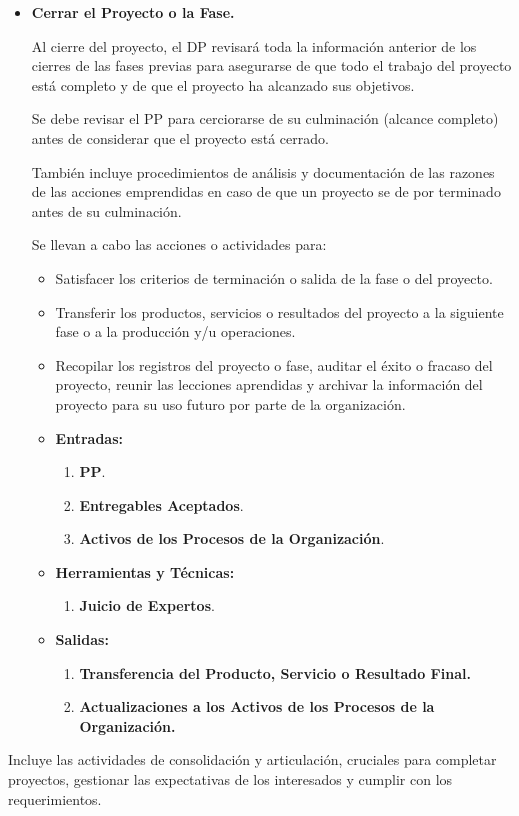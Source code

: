 \documentclass[10pt,a4paper]{article}
\begin{document}
\begin{itemize}
\item \textbf{Cerrar el Proyecto o la Fase.}	

Al cierre del proyecto, el DP revisará toda la información anterior de los cierres de las fases previas para asegurarse de que todo el trabajo del proyecto está completo y de que el proyecto ha alcanzado sus objetivos.

Se debe revisar el PP para cerciorarse de su culminación (alcance completo) antes de considerar que el proyecto está cerrado.

También incluye procedimientos de análisis y documentación de las razones de las acciones emprendidas en caso de que un proyecto se de por terminado antes de su culminación.

Se llevan a cabo las acciones o actividades para:
\begin{itemize}
\item Satisfacer los criterios de terminación o salida de la fase o del proyecto.
\item Transferir los productos, servicios o resultados del proyecto a la siguiente fase o a la producción y/u operaciones.
\item Recopilar los registros del proyecto o fase, auditar el éxito o fracaso del proyecto, reunir las lecciones aprendidas y archivar la información del proyecto para su uso futuro por parte de la organización.
\end{itemize}

\begin{itemize}
\item \textbf{Entradas:}
\begin{enumerate}
\item \textbf{PP}.
\item \textbf{Entregables Aceptados}.
\item \textbf{Activos de los Procesos de la Organización}.
\end{enumerate}

\item \textbf{Herramientas y Técnicas:}
\begin{enumerate}
\item \textbf{Juicio de Expertos}.
\end{enumerate}

\item \textbf{Salidas:}
\begin{enumerate}
\item \textbf{Transferencia del Producto, Servicio o Resultado Final.}
\item \textbf{Actualizaciones a los Activos de los Procesos de la Organización.}
\end{enumerate}
\end{itemize}

\end{itemize}
Incluye las actividades de consolidación y articulación, cruciales para completar proyectos, gestionar las expectativas de los interesados y cumplir con los requerimientos.
\end{document}

